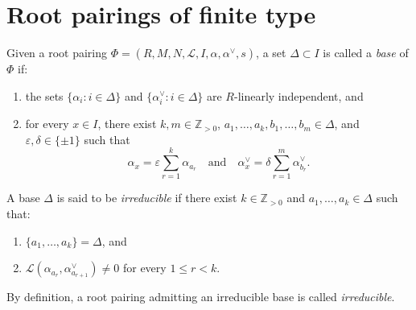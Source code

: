 \chapter{Root pairings of finite type}



\begin{definition}\label{def:root_pairing_base}
\leanok
Given a root pairing $\Phi=(R,M,N,\mathcal{L},I,\alpha,\alpha^\vee,s)$,
a set $\Delta\subset I$ is called a \emph{base} of $\Phi$ if:
\begin{enumerate}
    \item the sets $\{\alpha_i:i\in\Delta\}$ and
    $\{\alpha_i^\vee:i\in\Delta\}$ are $R$-linearly independent, and
    \item for every $x\in I$, there exist
    $k,m\in\mathbb{Z}_{>0}$,
    $a_1,\ldots,a_k,b_1,\ldots,b_m\in\Delta$, and
    $\varepsilon,\delta\in\{\pm1\}$ such that
    \[
        \alpha_x=\varepsilon\sum_{r=1}^k\alpha_{a_r}
        \quad\text{and}\quad
        \alpha_x^\vee=\delta\sum_{r=1}^m\alpha_{b_r}^\vee.
    \]
\end{enumerate}
\end{definition}

\begin{definition}\label{def:irreducible_base}
\leanok
A base $\Delta$ is said to be \emph{irreducible} if there exist
$k\in\mathbb{Z}_{>0}$ and $a_1,\ldots,a_k\in\Delta$ such that:
\begin{enumerate}
    \item $\{a_1,\ldots,a_k\}=\Delta$, and
    \item $\mathcal{L}(\alpha_{a_r},\alpha_{a_{r+1}}^\vee)\ne0$ for every
    $1\le r<k$.
\end{enumerate}
By definition, a root pairing admitting an irreducible base is called \emph{irreducible}.
\end{definition}

